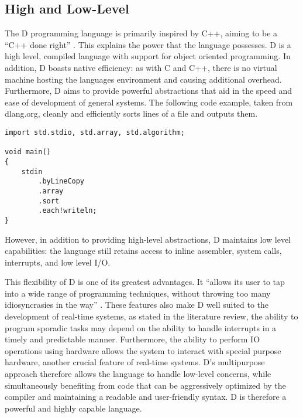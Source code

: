 \subsection{High and Low-Level}
The D programming language is primarily inspired by C++, aiming to be a ``C++ done
right'' 
\cite{qznc-tutorial}. 
This explains the power that the language possesses. D is a high level, compiled 
language with support for object oriented programming. In addition, D boasts 
native efficiency: as with C and C++, there is no virtual 
machine hosting the languages environment and causing additional overhead. 
Furthermore, D aims to provide
powerful abstractions that aid in the speed and ease of development of general systems. 
The following code example, taken from dlang.org, cleanly and efficiently 
sorts lines of a file and outputs them. 
\begin{lstlisting}
import std.stdio, std.array, std.algorithm;

void main()
{
    stdin
        .byLineCopy
        .array
        .sort
        .each!writeln;
}
\end{lstlisting}
However, in addition to providing high-level abstractions, D maintains low 
level capabilities: the language still retains access to inline assembler, 
system calls, interrupts, and low level I/O.
\par\bigskip\noindent
This flexibility of D is one of its greatest advantages. It ``allows its user to tap 
into a wide range of programming techniques, without throwing too many 
idiosyncrasies in the way'' \cite{ddili-book}. 
These features also make D well suited to the development of real-time systems, 
as stated in the literature review, the ability to program sporadic tasks
may depend on the ability to handle interrupts in a timely and predictable manner.
Furthermore, the ability to perform IO operations using hardware allows the
system to interact with special purpose hardware, another crucial feature of
real-time systems.
D's multipurpose approach therefore allows the language to handle low-level concerns,
while simultaneously benefiting from code that can be aggressively optimized by the
compiler \cite{dlang-overview} and maintaining a readable and user-friendly
syntax. D is therefore a powerful and highly capable language.

